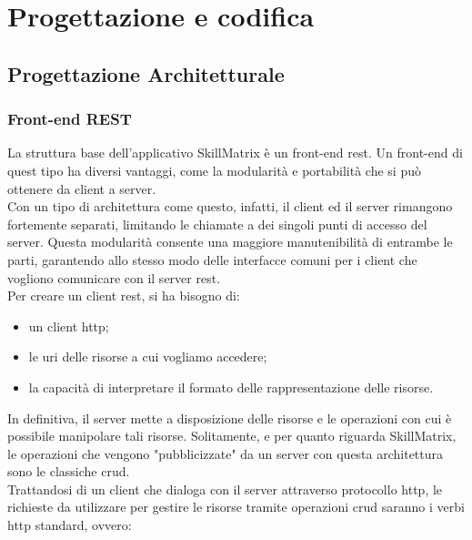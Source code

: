 
\chapter{Progettazione e codifica}
\label{cap:progettazione-codifica}

\section{Progettazione Architetturale}

\subsection{Front-end REST}
La struttura base dell'applicativo SkillMatrix è un \gls{front-end} \gls{rest}. Un \gls{front-end} di quest tipo ha diversi vantaggi, come la modularità e portabilità che si può ottenere da client a server.\\
Con un tipo di architettura come questo, infatti, il client ed il server rimangono fortemente separati, limitando le chiamate a dei singoli punti di accesso del server. Questa modularità consente una maggiore manutenibilità di entrambe le parti, garantendo allo stesso modo delle interfacce comuni per i client che vogliono comunicare con il server \gls{rest}.\\
Per creare un client \gls{rest}, si ha bisogno di:
\begin{itemize}
	\item un client \gls{http};
	\item le \gls{uri} delle risorse a cui vogliamo accedere;
	\item la capacità di interpretare il formato delle rappresentazione delle risorse.
\end{itemize}
In definitiva, il server mette a disposizione delle risorse e le operazioni con cui è possibile manipolare tali risorse. Solitamente, e per quanto riguarda SkillMatrix, le operazioni che vengono "pubblicizzate" da un server con questa architettura sono le classiche \gls{crud}.\\
Trattandosi di un client che dialoga con il server attraverso protocollo \gls{http}, le richieste da utilizzare per gestire le risorse tramite operazioni \gls{crud} saranno i verbi \gls{http} standard, ovvero:

